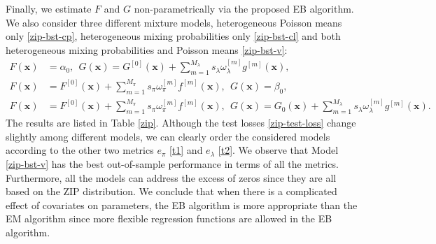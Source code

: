 \documentclass[11pt]{article}
\numberwithin{equation}{section}
\def\bx{\boldsymbol{x}}
\begin{document}
Finally, we estimate $F$ and $G$ non-parametrically via the proposed EB algorithm. We also consider three different mixture models, heterogeneous Poisson means only  \eqref{zip-bst-cp}, heterogeneous mixing probabilities only \eqref{zip-bst-cl} and both heterogeneous mixing probabilities and Poisson means \eqref{zip-bst-v}: 
\begin{align}
	F(\bx)&=\alpha_0, ~~G(\bx)=G^{[0]}(\bx)+\sum_{m=1}^{M_\lambda} s_\lambda\omega_\lambda^{[m]} g^{[m]}(\bx), \label{zip-bst-cp} \\
	F(\bx)&=F^{[0]}(\bx)+\sum_{m=1}^{M_\pi} s_\pi\omega_\pi^{[m]} f^{[m]}(\bx), ~~G(\bx)=\beta_0, \label{zip-bst-cl} \\
	F(\bx)&=F^{[0]}(\bx)+\sum_{m=1}^{M_\pi} s_\pi\omega_\pi^{[m]} f^{[m]}(\bx),  ~~G(\bx)=G_0(\bx)+\sum_{m=1}^{M_\lambda} s_\lambda\omega_\lambda^{[m]} g^{[m]}(\bx). \label{zip-bst-v}
\end{align}  
The results are listed in Table \ref{zip}.
Although the test losses \eqref{zip-test-loss} change slightly among different models, we can clearly order the considered models according to the other two metrics $e_\pi$ \eqref{t1} and $e_\lambda$ \eqref{t2}.
We observe that Model \eqref{zip-bst-v} has the best out-of-sample performance in terms of all the metrics.
Furthermore, all the models can address the excess of zeros since they are all based on the ZIP distribution.
We conclude that when there is a complicated effect of covariates on parameters, the EB algorithm is more appropriate than the EM algorithm since more flexible regression functions are allowed in the EB algorithm.   
\end{document}
